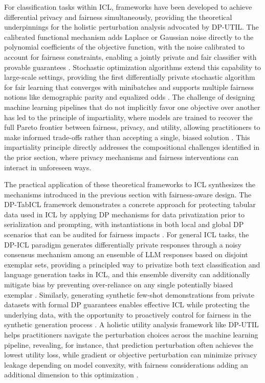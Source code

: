 \documentclass[11pt]{article}
\begin{document}
For classification tasks within ICL, frameworks have been developed to achieve differential privacy and fairness simultaneously, providing the theoretical underpinnings for the holistic perturbation analysis advocated by DP-UTIL. The calibrated functional mechanism adds Laplace or Gaussian noise directly to the polynomial coefficients of the objective function, with the noise calibrated to account for fairness constraints, enabling a jointly private and fair classifier with provable guarantees \cite{ref473}. Stochastic optimization algorithms extend this capability to large-scale settings, providing the first differentially private stochastic algorithm for fair learning that converges with minibatches and supports multiple fairness notions like demographic parity and equalized odds \cite{ref474}. The challenge of designing machine learning pipelines that do not implicitly favor one objective over another has led to the principle of impartiality, where models are trained to recover the full Pareto frontier between fairness, privacy, and utility, allowing practitioners to make informed trade-offs rather than accepting a single, biased solution \cite{ref475}. This impartiality principle directly addresses the compositional challenges identified in the prior section, where privacy mechanisms and fairness interventions can interact in unforeseen ways.

The practical application of these theoretical frameworks to ICL synthesizes the mechanisms introduced in the previous section with fairness-aware design. The DP-TabICL framework demonstrates a concrete approach for protecting tabular data used in ICL by applying DP mechanisms for data privatization prior to serialization and prompting, with instantiations in both local and global DP scenarios that can be audited for fairness impacts \cite{ref455}. For general ICL tasks, the DP-ICL paradigm generates differentially private responses through a noisy consensus mechanism among an ensemble of LLM responses based on disjoint exemplar sets, providing a principled way to privatize both text classification and language generation tasks in ICL, and this ensemble diversity can additionally mitigate bias by preventing over-reliance on any single potentially biased exemplar \cite{ref454}. Similarly, generating synthetic few-shot demonstrations from private datasets with formal DP guarantees enables effective ICL while protecting the underlying data, with the opportunity to proactively control for fairness in the synthetic generation process \cite{ref476}. A holistic utility analysis framework like DP-UTIL helps practitioners navigate the perturbation choices across the machine learning pipeline, revealing, for instance, that prediction perturbation often achieves the lowest utility loss, while gradient or objective perturbation can minimize privacy leakage depending on model convexity, with fairness considerations adding an additional dimension to this optimization \cite{ref456}.
\end{document}
